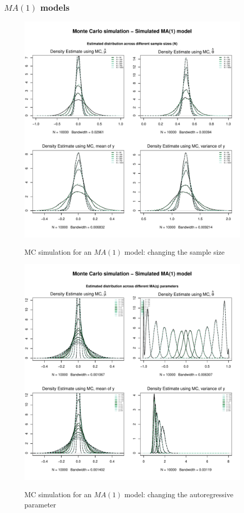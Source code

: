 \documentclass{article}
\begin{document}
\clearpage
\subsubsection{$MA(1)$ models}
\begin{figure}[hbt!]
\includegraphics[width=\textwidth]{plots/MC_MA1_densities_diff_smpl}
\label{fig:MC_MA1_densities_diff_smpl}
\caption{MC simulation for an $MA(1)$ model: changing the sample size}
\centering
\end{figure}

\begin{figure}[hbt!]
\includegraphics[width=\textwidth]{plots/MC_MA1_densities_diff_ARq}
\label{fig:MC_MA1_densities_diff_ARq}
\caption{MC simulation for an $MA(1)$ model: changing the autoregressive parameter}
\centering
\end{figure}
\end{document}
